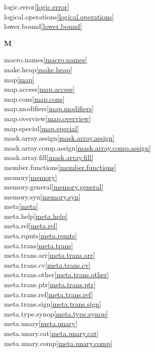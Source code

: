 \begin{multicols}{2}
logic.error\quad\ref{logic.error}\\
logical.operations\quad\ref{logical.operations}\\
lower.bound\quad\ref{lower.bound}\\
\par \textbf{M}\par
macro.names\quad\ref{macro.names}\\
make.heap\quad\ref{make.heap}\\
map\quad\ref{map}\\
map.access\quad\ref{map.access}\\
map.cons\quad\ref{map.cons}\\
map.modifiers\quad\ref{map.modifiers}\\
map.overview\quad\ref{map.overview}\\
map.special\quad\ref{map.special}\\
mask.array.assign\quad\ref{mask.array.assign}\\
mask.array.comp.assign\quad\ref{mask.array.comp.assign}\\
mask.array.fill\quad\ref{mask.array.fill}\\
member.functions\quad\ref{member.functions}\\
memory\quad\ref{memory}\\
memory.general\quad\ref{memory.general}\\
memory.syn\quad\ref{memory.syn}\\
meta\quad\ref{meta}\\
meta.help\quad\ref{meta.help}\\
meta.rel\quad\ref{meta.rel}\\
meta.rqmts\quad\ref{meta.rqmts}\\
meta.trans\quad\ref{meta.trans}\\
meta.trans.arr\quad\ref{meta.trans.arr}\\
meta.trans.cv\quad\ref{meta.trans.cv}\\
meta.trans.other\quad\ref{meta.trans.other}\\
meta.trans.ptr\quad\ref{meta.trans.ptr}\\
meta.trans.ref\quad\ref{meta.trans.ref}\\
meta.trans.sign\quad\ref{meta.trans.sign}\\
meta.type.synop\quad\ref{meta.type.synop}\\
meta.unary\quad\ref{meta.unary}\\
meta.unary.cat\quad\ref{meta.unary.cat}\\
meta.unary.comp\quad\ref{meta.unary.comp}\\

\end{multicols}
